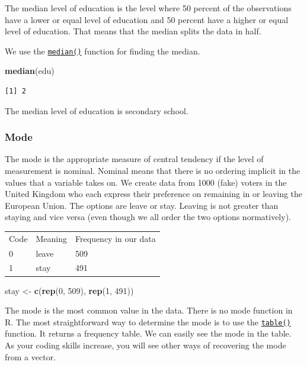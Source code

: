 \documentclass[]{book}
\newenvironment{Shaded}{\begin{snugshade}}{\end{snugshade}}
\newcommand{\KeywordTok}[1]{\textcolor[rgb]{0.13,0.29,0.53}{\textbf{#1}}}
\newcommand{\DecValTok}[1]{\textcolor[rgb]{0.00,0.00,0.81}{#1}}
\newcommand{\StringTok}[1]{\textcolor[rgb]{0.31,0.60,0.02}{#1}}
\newcommand{\NormalTok}[1]{#1}
\theoremstyle{definition}
\theoremstyle{definition}
\theoremstyle{definition}
\theoremstyle{remark}
\begin{document}
The median level of education is the level where 50 percent of the
observations have a lower or equal level of education and 50 percent
have a higher or equal level of education. That means that the median
splits the data in half.

We use the \href{http://bit.ly/R_median}{\texttt{median()}} function for
finding the median.

\begin{Shaded}
\begin{Highlighting}[]
\KeywordTok{median}\NormalTok{(edu)}
\end{Highlighting}
\end{Shaded}

\begin{verbatim}
[1] 2
\end{verbatim}

The median level of education is secondary school.

\subsubsection{Mode}\label{mode}

The mode is the appropriate measure of central tendency if the level of
measurement is nominal. Nominal means that there is no ordering implicit
in the values that a variable takes on. We create data from 1000 (fake)
voters in the United Kingdom who each express their preference on
remaining in or leaving the European Union. The options are leave or
stay. Leaving is not greater than staying and vice versa (even though we
all order the two options normatively).

\begin{longtable}[]{@{}lll@{}}
\toprule
Code & Meaning & Frequency in our data\tabularnewline
0 & leave & 509\tabularnewline
1 & stay & 491\tabularnewline
\bottomrule
\end{longtable}

\begin{Shaded}
\begin{Highlighting}[]
\NormalTok{stay <-}\StringTok{ }\KeywordTok{c}\NormalTok{(}\KeywordTok{rep}\NormalTok{(}\DecValTok{0}\NormalTok{, }\DecValTok{509}\NormalTok{), }\KeywordTok{rep}\NormalTok{(}\DecValTok{1}\NormalTok{, }\DecValTok{491}\NormalTok{))}
\end{Highlighting}
\end{Shaded}

The mode is the most common value in the data. There is no mode function
in R. The most straightforward way to determine the mode is to use the
\href{http://bit.ly/R_table}{\texttt{table()}} function. It returns a
frequency table. We can easily see the mode in the table. As your coding
skills increase, you will see other ways of recovering the mode from a
vector.
\end{document}
